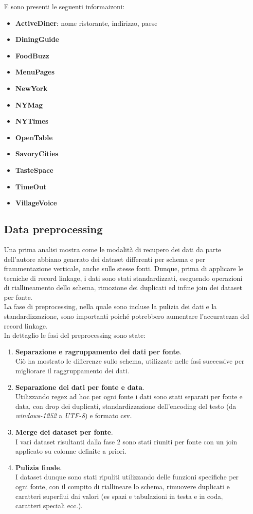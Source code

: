 \documentclass[a4paper,12pt]{article}
\begin{document}
E sono presenti le seguenti informaizoni: %
\begin{itemize}
\item \textbf{ActiveDiner}: nome ristorante, indirizzo, paese
\item \textbf{DiningGuide}
\item \textbf{FoodBuzz}
\item \textbf{MenuPages}
\item \textbf{NewYork}
\item \textbf{NYMag}
\item \textbf{NYTimes}
\item \textbf{OpenTable}
\item \textbf{SavoryCities}
\item \textbf{TasteSpace}
\item \textbf{TimeOut}
\item \textbf{VillageVoice}
\end{itemize}

\subsection{Data preprocessing} 
Una prima analisi mostra come le modalità di recupero dei dati da parte dell'autore abbiano generato dei dataset differenti per schema e per frammentazione verticale, anche sulle stesse fonti. Dunque, prima di applicare le tecniche di record linkage, i dati sono stati standardizzati, eseguendo operazioni di riallineamento dello schema, rimozione dei duplicati ed infine join dei dataset per fonte.\\
La fase di preprocessing, nella quale sono incluse la pulizia dei dati e la standardizzazione, sono importanti poiché potrebbero aumentare l'accuratezza del record linkage.\\
In dettaglio le fasi del preprocessing sono state: %
\begin{enumerate}
	\item \textbf{Separazione e ragruppamento dei dati per fonte}.\\Ciò ha mostrato le differenze sullo schema, utilizzate nelle fasi successive per migliorare il raggruppamento dei dati.
	\item \textbf{Separazione dei dati per fonte e data}.\\Utilizzando regex ad hoc per ogni fonte i dati sono stati separati per fonte e data, con drop dei duplicati, standardizzazione dell'encoding del testo (da \textit{windows-1252} a \textit{UTF-8}) e formato csv.
	\item \textbf{Merge dei dataset per fonte}.\\I vari dataset risultanti dalla fase 2 sono stati riuniti per fonte con un join applicato su colonne definite a priori. 
	\item \textbf{Pulizia finale}.\\I dataset dunque sono stati ripuliti utilizzando delle funzioni specifiche per ogni fonte, con il compito di riallineare lo schema, rimuovere duplicati e caratteri superflui dai valori (es spazi e tabulazioni in testa e in coda, caratteri speciali ecc.).  
\end{enumerate}
\end{document}
